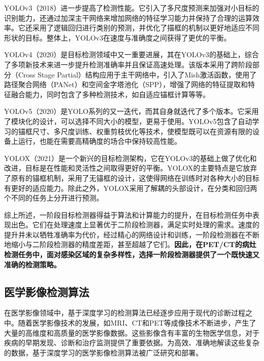 YOLOv3\cite{redmon2018yolov3}（2018）进一步提高了检测性能。它引入了多尺度预测来加强对小目标的识别能力，还通过加深主干网络来增加网络的特征学习能力并保持了合理的运算效率。它还采用了逻辑回归进行类别的预测，并优化了描框的机制以更好地适应不同形状的目标。整体上，YOLOv3在速度与准确度之间获得了更优的平衡。

YOLOv4\cite{bochkovskiy2020yolov4}（2020）是目标检测领域中又一重要进展，其在YOLOv3\cite{redmon2018yolov3}的基础上，综合了多项新技术来进一步提升检测准确率并且保证高速处理。该版本采用了跨阶段部分（Cross Stage Partial）\cite{wang2020cspnet}结构应用于主干网络中，引入了Mish\cite{misra2019mish}激活函数，使用了路径聚合网络（PANet）\cite{liu2018path}和空间金字塔池化（SPP）\cite{he2015spatial}，增强了网络的特征提取和特征融合能力，同时包含了多种检测技术，如自适应锚框计算等等。

YOLOv5\cite{jocher2020yolov5}（2020）是YOLO系列的又一迭代，而其自身就迭代了多个版本。它采用了模块化的设计，可以选择不同大小的模型，更易于使用。YOLOv5包含了自动学习的锚框尺寸、多尺度训练、权重剪枝优化等技术，使模型既可以在资源有限的设备上运行，也能在需要高精确度的场合中保持较高性能。

YOLOX\cite{ge2021yolox}（2021）是一个新兴的目标检测架构，它在YOLOv3的基础上做了优化和改进，目标是在性能和灵活性之间取得更好的平衡。YOLOX的主要特点是它放弃了原有的锚框机制，采用了无锚框的设计，这使得网络在训练时对各种大小的目标有更好的适应能力。除此之外，YOLOX采用了解耦的头部设计，在分类和回归两个不同的任务上分开进行预测。

综上所述，一阶段目标检测器得益于算法和计算能力的提升，在目标检测任务中表现出色。它们在处理速度上显著优于二阶段检测器，满足实时处理的需求。速度的提升并未以牺牲准确率为代价，经过精心的网络设计和训练，一阶段检测器在不断地缩小与二阶段检测器的精度差距，甚至超越了它们。\textbf{因此，在PET/CT的病灶检测任务中，面对感染区域的复杂多样性，选择一阶段检测器提供了一个既快速又准确的检测策略。}

\subsection{医学影像检测算法}

在医学影像领域中，基于深度学习的检测算法已经逐步应用于现代的诊断过程之中。随着医学影像技术的发展，如MRI、CT和PET等成像技术不断进步，产生了大量的高维度和高质量的医学影像数据。这些影像含有丰富的生物医学信息，对于疾病的早期发现、诊断和治疗监测提供了重要依据。为高效、准确地解读这些复杂的数据，基于深度学习的医学影像检测算法被广泛研究和部署。

